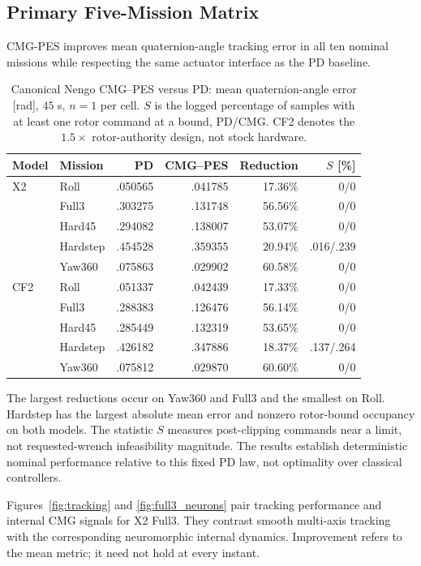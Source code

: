 \documentclass[letterpaper, 10 pt, conference]{ieeeconf}
\begin{document}
\subsection{Primary Five-Mission Matrix}
CMG-PES improves mean quaternion-angle tracking error in all ten nominal missions while respecting the same actuator interface as the PD baseline.
%
\begin{table}[h]
\caption{Canonical Nengo CMG--PES versus PD: mean quaternion-angle error
[rad], $45$ s, $n=1$ per cell. $S$ is the logged percentage of samples with
at least one rotor command at a bound, PD/CMG. CF2 denotes the $1.5\times$
rotor-authority design, not stock hardware.}
\label{tab:mujoco}\centering\scriptsize
\setlength{\tabcolsep}{3pt}
\begin{tabular}{llrrrr}
\toprule
Model&Mission&PD&CMG--PES&Reduction&$S$ [\%]\\\midrule
X2&Roll&.050565&.041785&17.36\%&0/0\\
&Full3&.303275&.131748&56.56\%&0/0\\
&Hard45&.294082&.138007&53.07\%&0/0\\
&Hardstep&.454528&.359355&20.94\%&.016/.239\\
&Yaw360&.075863&.029902&60.58\%&0/0\\\midrule
CF2&Roll&.051337&.042439&17.33\%&0/0\\
&Full3&.288383&.126476&56.14\%&0/0\\
&Hard45&.285449&.132319&53.65\%&0/0\\
&Hardstep&.426182&.347886&18.37\%&.137/.264\\
&Yaw360&.075812&.029870&60.60\%&0/0\\\bottomrule
\end{tabular}
\end{table}
%
The largest reductions occur on Yaw360 and Full3 and the smallest on Roll.
Hardstep has the largest absolute mean error and nonzero rotor-bound
occupancy on both models. The statistic $S$ measures post-clipping commands
near a limit, not requested-wrench infeasibility magnitude. The results
establish deterministic nominal performance relative to this fixed PD law,
not optimality over classical controllers.

Figures~\ref{fig:tracking} and \ref{fig:full3_neurons} pair tracking
performance and internal CMG signals for X2 Full3. They contrast smooth
multi-axis tracking with the corresponding neuromorphic internal dynamics.
Improvement refers to the mean metric; it need not hold at every instant.
\end{document}
